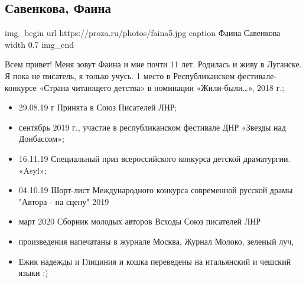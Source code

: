  
 
 

\subsection{Савенкова, Фаина}

\ifcmt
img_begin 
	url https://proza.ru/photos/faina5.jpg
	caption Фаина Савенкова
	width 0.7
img_end
\fi

Всем привет! Меня зовут Фаина и мне почти 11 лет. Родилась и живу в Луганске. Я
пока не писатель, я только учусь. 1 место в Республиканском фестивале-конкурсе
«Страна читающего детства» в номинации «Жили-были…», 2018 г.;

\begin{itemize}
  \item 29.08.19 г Принята в Союз Писателей ЛНР;
  \item сентябрь 2019 г., участие в республиканском фестивале ДНР «Звезды над Донбассом»;
  \item 16.11.19 Специальный приз всероссийского конкурса детской драматургии.  «Asyl»;
  \item 04.10.19 Шорт-лист Международного конкурса современной русской драмы "Автора - на сцену" 2019
  \item март 2020 Сборник молодых авторов Всходы Союз писателей ЛНР
  \item произведения напечатаны в журнале Москва, Журнал Молоко, зеленый луч,
  \item Ежик надежды и Глициния и кошка переведены на итальянский и чешский языки :)
\end{itemize}



